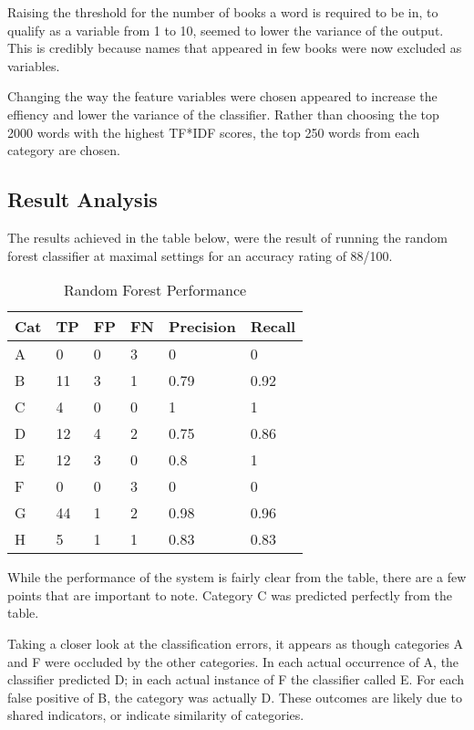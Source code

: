 \documentclass[11pt]{article}
\begin{document}
Raising the threshold for the number of books a word is required to be in, to
qualify as a variable from 1 to 10, seemed to lower the variance of the output.
This is credibly because names that appeared in few books were now excluded as
variables.

Changing the way the feature variables were chosen appeared to increase the
effiency and lower the variance of the classifier. Rather than choosing the top
2000 words with the highest TF*IDF scores, the top 250 words from each category
are chosen.

\subsection{Result Analysis}

The results achieved in the table below, were the result of running the random
forest classifier at maximal settings for an accuracy rating of 88/100.

\begin{table}[h]
\begin{center}
    \begin{tabular}{|l|l|l|l|l|l|}
        \hline
        Cat & TP & FP & FN & Precision & Recall \\
        \hline \hline
        A & 0   & 0 & 3 & 0    & 0      \\
        B & 11  & 3 & 1 & 0.79 & 0.92   \\
        C & 4   & 0 & 0 & 1    & 1      \\
        D & 12  & 4 & 2 & 0.75 & 0.86   \\
        E & 12  & 3 & 0 & 0.8  & 1      \\
        F & 0   & 0 & 3 & 0    & 0      \\
        G & 44  & 1 & 2 & 0.98 & 0.96   \\
        H & 5   & 1 & 1 & 0.83 & 0.83   \\
        \hline
    \end{tabular}
\caption{Random Forest Performance}\label{table1}
\end{center}
\end{table}

While the performance of the system is fairly clear from the table, there are a
few points that are important to note. Category C was predicted perfectly from
the table.

Taking a closer look at the classification errors, it appears as though
categories A and F were occluded by the other categories. In each actual
occurrence of A, the classifier predicted D; in each actual instance of F the
classifier called E. For each false positive of B, the category was actually D.
These outcomes are likely due to shared indicators, or indicate similarity of
categories.
\end{document}
